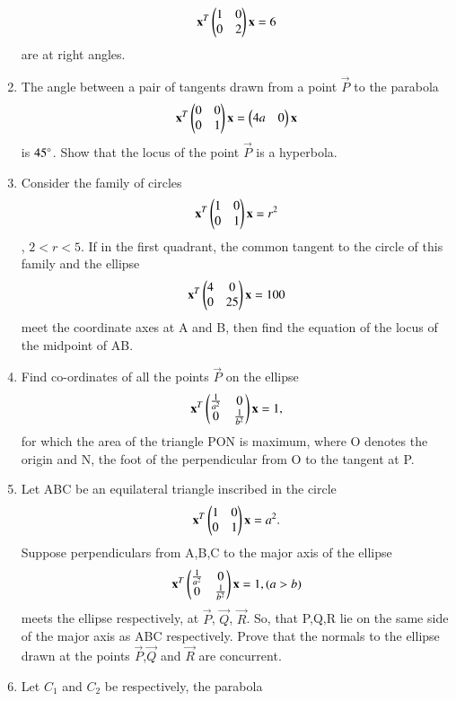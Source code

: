 \begin{enumerate}[label=\arabic*.,ref=\thesubsection.\theenumi]
\begin{align}
    \mathbf{x}^T\begin{pmatrix}1&0\\0&2\end{pmatrix}\mathbf{x}=6
    \end{align} are at right angles.
    \item The angle between a pair of tangents drawn from a point $\vec{P}$ to the parabola
    \begin{align}
    \mathbf{x}^T\begin{pmatrix}0&0\\0&1\end{pmatrix}\mathbf{x}=\begin{pmatrix}4a&0\end{pmatrix}\mathbf{x}
    \end{align} is $45\degree$. Show that the locus of the point $\vec{P}$ is a hyperbola.
    \item Consider the family of circles 
    \begin{align}
    \mathbf{x}^T\begin{pmatrix}1&0\\0&1\end{pmatrix}\mathbf{x}=r^2
    \end{align}, $2<r<5$. If in the first quadrant, the common tangent to the circle of this family and the ellipse 
    \begin{align}
    \mathbf{x}^T\begin{pmatrix}4&0\\0&25\end{pmatrix}\mathbf{x}=100
    \end{align} meet the coordinate axes at A and B, then find the equation of the locus of the midpoint of AB.
    \item Find co-ordinates of all the points $\vec{P}$ on the ellipse 
    \begin{align}
    \mathbf{x}^T\begin{pmatrix}\frac{1}{a^2}&0\\0&\frac{1}{b^2}\end{pmatrix}\mathbf{x}=1,
    \end{align} for which the area of the triangle PON is maximum, where O denotes the origin and 			N, the foot of the perpendicular from O to the tangent at P.
    \item Let ABC be an equilateral triangle inscribed in the circle 
    \begin{align} 
    \mathbf{x}^T\begin{pmatrix}1&0\\0&1\end{pmatrix}\mathbf{x}=a^2.
    \end{align} Suppose perpendiculars from A,B,C to the major axis of the ellipse 
    \begin{align}
    \mathbf{x}^T\begin{pmatrix}\frac{1}{a^2}&0\\0&\frac{1}{b^2}\end{pmatrix}\mathbf{x}=1,(a>b)
    \end{align}  meets the ellipse respectively, at $\vec{P}$, $\vec{Q}$, $\vec{R}$. So, that 
    P,Q,R lie on the same side of the major axis as ABC respectively. Prove that the normals to the ellipse drawn at the points $\vec{P}$,$\vec{Q}$ and $\vec{R}$ are concurrent.
    \item Let $C_1$ and $C_2$ be respectively, the parabola 

\end{enumerate}
